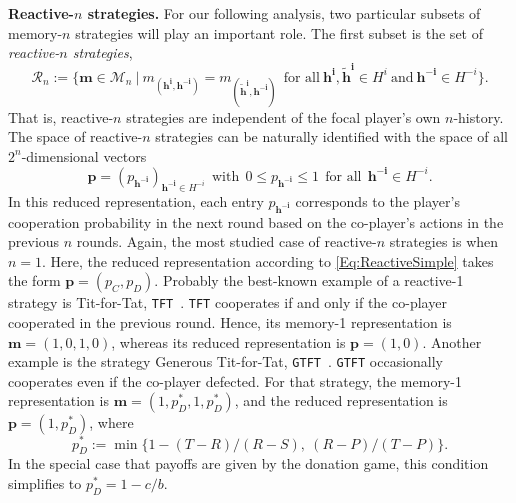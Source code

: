 \documentclass[9pt,twoside,lineno]{pnas-new}
\theoremstyle{plainCl1}
\theoremstyle{plainCl2}
\def\tft{\texttt{TFT}}
\def\gtft{\texttt{GTFT}}
\begin{document}
\noindent
{\bfseries Reactive-$n$ strategies.} For our following analysis, two particular subsets of memory-$n$ strategies will play an important role. 
The first subset is the set of {\it reactive-$n$ strategies}, 
\begin{equation}
\mathcal{R}_n:=\Big\{ \mathbf{m}\!\in\!\mathcal{M}_n ~\Big|~ m_{(\mathbf{h^i},\mathbf{h^{-i}})}\!=\!m_{(\mathbf{\tilde{h}^i},\mathbf{h^{-i}})}~~\text{for all}~\mathbf{h^i}, \mathbf{\tilde{h}^i}\!\in\!H^i~\text{and}~\mathbf{h^{-i}}\!\in\!H^{-i}\Big\}.
\end{equation}
That is, reactive-$n$ strategies are independent of the focal player's own $n$-history. 
The space of \mbox{reactive-$n$} strategies can be naturally identified with the space of all $2^n$-dimensional vectors 
\begin{equation}\label{Eq:ReactiveSimple}
\mathbf{p}\!=\!(p_\mathbf{h^{-i}})_{\mathbf{h^{-i}}\in H^{-i}} ~~\text{with}~~ 0\!\le\!p_\mathbf{h^{-i}}\!\le\!1 ~~\text{for all}~~ \mathbf{h^{-i}}\!\in\! H^{-i}.
\end{equation}
In this reduced representation, each entry $p_{\mathbf{h^{-i}}}$ corresponds to the player's cooperation
probability in the next round based on the co-player's actions in the previous
$n$ rounds. 
Again, the most studied case of reactive-$n$ strategies is when $n\!=\!1$.
Here, the reduced representation according to \eqref{Eq:ReactiveSimple} takes the form $\mathbf{p}\!=\!(p_C,p_D)$.
Probably the best-known example of a reactive-1 strategy is Tit-for-Tat, \tft~\citep{axelrod:AAAS:1981}. 
\tft{} cooperates if and only if the co-player cooperated in the previous round. 
Hence, its memory-1 representation is $\mathbf{m}\!=\!(1,0,1,0)$, whereas its reduced representation is $\mathbf{p}\!=\!(1,0)$. 
Another example is the strategy Generous Tit-for-Tat, \gtft~\citep{nowak:Nature:1992,molander:jcr:1985}.
\gtft{} occasionally cooperates even if the co-player defected. 
For that strategy, the memory-1 representation is $\mathbf{m}\!=\!(1,p^*_D,1,p^*_D)$, and the reduced representation is $\mathbf{p}\!=\!(1,p^*_D)$, where 
\begin{equation} \label{Eq:ConditionGTFT}
p^*_D\!:=\!\min\big\{1\!-\!(T\!-\!R)/(R\!-\!S),~(R\!-\!P)/(T\!-\!P)\big\}.
\end{equation} 
In the special case that payoffs are given by the donation game, this condition simplifies to $p^*_D\!=\!1-c/b$.\\
\end{document}
